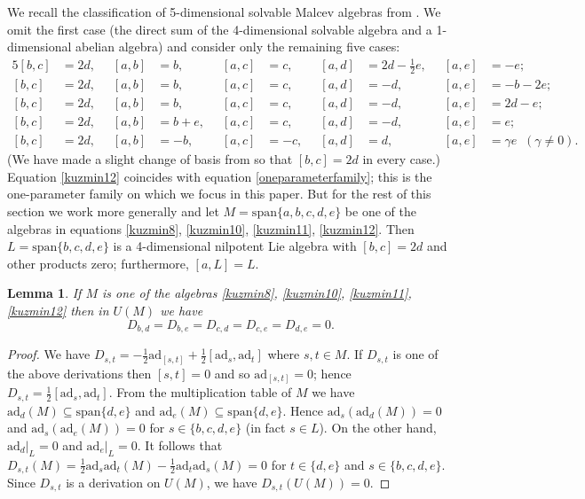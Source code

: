 \documentclass{amsart}
\theoremstyle{plain}
\newtheorem{lemma}{Lemma}[section]
\theoremstyle{definition}
\begin{document}
We recall the classification of 5-dimensional solvable Malcev algebras from
\cite{Kuzmin}. We omit the first case (the direct sum of the 4-dimensional
solvable algebra and a 1-dimensional abelian algebra) and consider only the
remaining five cases:
  \allowdisplaybreaks
  \begin{alignat}{5}
  [b,c] &= 2d, &\;\;
  [a,b] &=  b, &\;\;
  [a,c] &=  c, &\;\;
  [a,d] &= 2d - \tfrac12 e, &\;\;
  [a,e] &= -e;
  \label{kuzmin8}
  \\
  [b,c] &= 2d, &\;\;
  [a,b] &=  b, &\;\;
  [a,c] &=  c, &\;\;
  [a,d] &= -d, &\;\;
  [a,e] &= -b-2e;
  \label{kuzmin9}
  \\
  [b,c] &= 2d, &\;\;
  [a,b] &=  b, &\;\;
  [a,c] &=  c, &\;\;
  [a,d] &= -d, &\;\;
  [a,e] &= 2d-e;
  \label{kuzmin10}
  \\
  [b,c] &= 2d, &\;\;
  [a,b] &=  b+e, &\;\;
  [a,c] &=  c, &\;\;
  [a,d] &= -d, &\;\;
  [a,e] &=  e;
  \label{kuzmin11}
  \\
  [b,c] &= 2d, &\;\;
  [a,b] &= -b, &\;\;
  [a,c] &= -c, &\;\;
  [a,d] &=  d, &\;\;
  [a,e] &= \gamma e \;\; (\gamma \ne 0).
  \label{kuzmin12}
  \end{alignat}
(We have made a slight change of basis from \cite{Kuzmin} so that $[b,c] = 2d$
in every case.) Equation \eqref{kuzmin12} coincides with equation
\eqref{oneparameterfamily}; this is the one-parameter family on which we focus
in this paper. But for the rest of this section we work more generally and let
$M =\text{span}\{a,b,c,d,e\}$ be one of the algebras in equations
\eqref{kuzmin8}, \eqref{kuzmin10}, \eqref{kuzmin11}, \eqref{kuzmin12}. Then $L
= \text{span}\{b,c,d,e\}$ is a 4-dimensional nilpotent Lie algebra with $[b,c]
= 2d$ and other products zero; furthermore, $[a,L] = L$.

\begin{lemma} \label{zeroderivations}
If $M$ is one of the algebras \eqref{kuzmin8}, \eqref{kuzmin10},
\eqref{kuzmin11}, \eqref{kuzmin12} then in $U(M)$ we have
  \[
  D_{b,d} = D_{b,e} = D_{c,d} = D_{c,e} = D_{d,e} = 0.
  \]
\end{lemma}

\begin{proof}
We have $D_{s,t}= -\frac12 \mathrm{ad}_{[s,t]} + \frac12 [\mathrm{ad}_s,
\mathrm{ad}_t]$ where $s, t \in M$. If $D_{s,t}$ is one of the above
derivations then $[s,t] = 0$ and so $\mathrm{ad}_{[s,t]} = 0$; hence $D_{s,t} =
\frac12 [\mathrm{ad}_s, \mathrm{ad}_t ]$. From the multiplication table of $M$
we have $\mathrm{ad}_d(M) \subseteq \mathrm{span} \{ d, e \} $ and
$\mathrm{ad}_e (M) \subseteq \mathrm{span} \{ d,e \}$. Hence $\mathrm{ad}_s (
\mathrm{ad}_d (M) ) = 0$ and $\mathrm{ad}_s ( \mathrm{ad}_e (M) ) = 0$ for $s
\in \{b,c,d,e\}$ (in fact $s \in L$). On the other hand, $\mathrm{ad}_d |_L =0$
and $\mathrm{ad}_e |_L =0$. It follows that $D_{s,t}(M) = \frac12 \mathrm{ad}_s
\mathrm{ad}_t(M) - \frac12 \mathrm{ad}_t\mathrm{ad}_s (M) =0$ for $t \in \{ d,
e \}$ and $ s \in \{b,c,d,e\}$. Since $D_{s,t}$ is a derivation on $U(M)$, we
have $D_{s,t}(U(M))=0$.
\end{proof}
\end{document}
